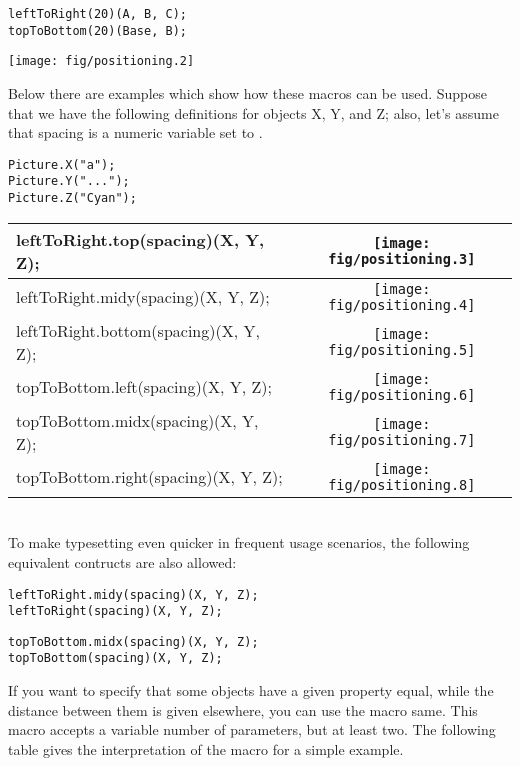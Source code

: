 \documentclass{article}
\newcommand{\code}{\ttfamily}
\begin{document}
\begin{multicols}{2}
\begin{verbatim}
leftToRight(20)(A, B, C);
topToBottom(20)(Base, B);
\end{verbatim}
\columnbreak
\hspace{1cm}\texttt{[image: fig/positioning.2]}
\end{multicols}

Below there are examples which show how these macros can be used. Suppose that we have the following definitions for objects {\code X}, {\code Y}, and {\code Z}; also, let's assume that {\code spacing} is a numeric variable set to {\code 5}.

\begin{verbatim}
Picture.X("a");
Picture.Y("...");
Picture.Z("Cyan");
\end{verbatim}

\begin{tabular}{||l|c||}
\hline
{\code leftToRight.top(spacing)(X, Y, Z);} & \texttt{[image: fig/positioning.3]} \\
\hline
{\code leftToRight.midy(spacing)(X, Y, Z);} & \texttt{[image: fig/positioning.4]} \\
\hline
{\code leftToRight.bottom(spacing)(X, Y, Z);} & \texttt{[image: fig/positioning.5]} \\
\hline
{\code topToBottom.left(spacing)(X, Y, Z);} & \texttt{[image: fig/positioning.6]} \\
\hline
{\code topToBottom.midx(spacing)(X, Y, Z);} & \texttt{[image: fig/positioning.7]} \\
\hline
{\code topToBottom.right(spacing)(X, Y, Z);} & \texttt{[image: fig/positioning.8]} \\
\hline
\end{tabular} \\

To make typesetting even quicker in frequent usage scenarios, the following equivalent contructs are also allowed:

\begin{verbatim}
leftToRight.midy(spacing)(X, Y, Z);
leftToRight(spacing)(X, Y, Z);
\end{verbatim}

\begin{verbatim}
topToBottom.midx(spacing)(X, Y, Z);
topToBottom(spacing)(X, Y, Z);
\end{verbatim}

If you want to specify that some objects have a given property equal, while the distance between them is given elsewhere, you can use the macro {\code same}.
This macro accepts a variable number of parameters, but at least two. The following table gives the interpretation of the macro for a simple example.
\end{document}
